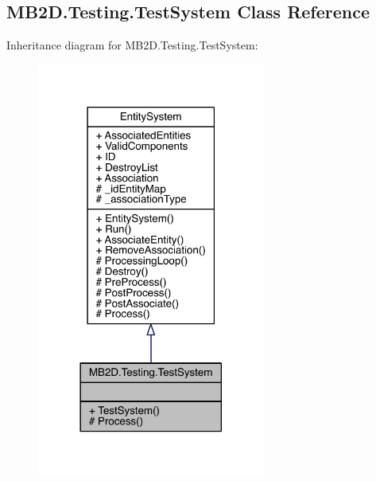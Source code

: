 \hypertarget{class_m_b2_d_1_1_testing_1_1_test_system}{}\subsection{M\+B2\+D.\+Testing.\+Test\+System Class Reference}
\label{class_m_b2_d_1_1_testing_1_1_test_system}


Inheritance diagram for M\+B2\+D.\+Testing.\+Test\+System\+:
\nopagebreak
\begin{figure}[H]
\begin{center}
\leavevmode
\includegraphics[width=213pt]{class_m_b2_d_1_1_testing_1_1_test_system__inherit__graph}
\end{center}
\end{figure}


